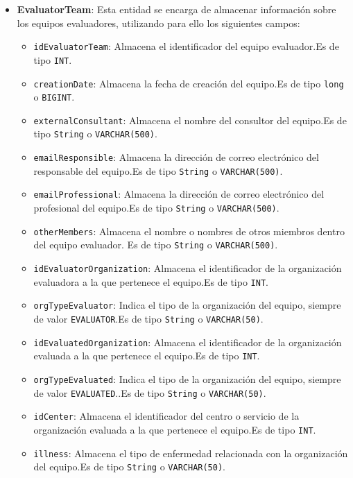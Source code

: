 \begin{itemize}
        \item \textbf{EvaluatorTeam}: Esta entidad se encarga de almacenar información sobre los equipos evaluadores, utilizando para ello los siguientes campos:
        \begin{itemize}
        \item \texttt{idEvaluatorTeam}: Almacena el identificador del equipo evaluador.Es de tipo \texttt{INT}.
        \item \texttt{creationDate}: Almacena la fecha de creación del equipo.Es de tipo \texttt{long} o \texttt{BIGINT}.
        \item \texttt{externalConsultant}: Almacena el nombre del consultor del equipo.Es de tipo \texttt{String} o \texttt{VARCHAR(500)}.
        \item \texttt{emailResponsible}: Almacena la dirección de correo electrónico del responsable del equipo.Es de tipo \texttt{String} o \texttt{VARCHAR(500)}.
        \item \texttt{emailProfessional}: Almacena la dirección de correo electrónico del profesional del equipo.Es de tipo \texttt{String} o \texttt{VARCHAR(500)}.
        \item \texttt{otherMembers}: Almacena el nombre o nombres de otros miembros dentro del equipo evaluador. Es de tipo \texttt{String} o \texttt{VARCHAR(500)}.
        \item \texttt{idEvaluatorOrganization}: Almacena el identificador de la organización evaluadora a la que pertenece el equipo.Es de tipo \texttt{INT}.
        \item \texttt{orgTypeEvaluator}: Indica el tipo de la organización del equipo, siempre de valor \texttt{EVALUATOR}.Es de tipo \texttt{String} o \texttt{VARCHAR(50)}.
        \item \texttt{idEvaluatedOrganization}: Almacena el identificador de la organización evaluada a la que pertenece el equipo.Es de tipo \texttt{INT}.
        \item \texttt{orgTypeEvaluated}: Indica el tipo de la organización del equipo, siempre de valor \texttt{EVALUATED}..Es de tipo \texttt{String} o \texttt{VARCHAR(50)}.
        \item \texttt{idCenter}: Almacena el identificador del centro o servicio de la organización evaluada a la que pertenece el equipo.Es de tipo \texttt{INT}.
        \item \texttt{illness}: Almacena el tipo de enfermedad relacionada con la organización del equipo.Es de tipo \texttt{String} o \texttt{VARCHAR(50)}.

\end{itemize}
\end{itemize}
